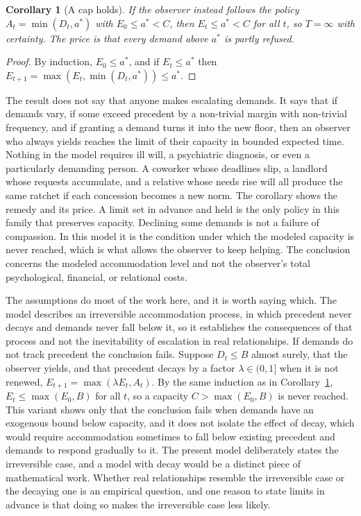 \documentclass[11pt]{article}
\newtheorem{corollary}{Corollary}
\theoremstyle{definition}
\theoremstyle{remark}
\begin{document}
\begin{corollary}[A cap holds]\label{cor:cap}
If the observer instead follows the policy $A_t=\min(D_t,a^{*})$ with $E_0\le a^{*}<C$, then $E_t\le a^{*}<C$ for all $t$, so $T=\infty$ with certainty. The price is that every demand above $a^{*}$ is partly refused.
\end{corollary}

\begin{proof}
By induction, $E_0\le a^{*}$, and if $E_t\le a^{*}$ then $E_{t+1}=\max(E_t,\min(D_t,a^{*}))\le a^{*}$.
\end{proof}

The result does not say that anyone makes escalating demands. It says that if demands vary, if some exceed precedent by a non-trivial margin with non-trivial frequency, and if granting a demand turns it into the new floor, then an observer who always yields reaches the limit of their capacity in bounded expected time. Nothing in the model requires ill will, a psychiatric diagnosis, or even a particularly demanding person. A coworker whose deadlines slip, a landlord whose requests accumulate, and a relative whose needs rise will all produce the same ratchet if each concession becomes a new norm. The corollary shows the remedy and its price. A limit set in advance and held is the only policy in this family that preserves capacity. Declining some demands is not a failure of compassion. In this model it is the condition under which the modeled capacity is never reached, which is what allows the observer to keep helping. The conclusion concerns the modeled accommodation level and not the observer's total psychological, financial, or relational costs.

The assumptions do most of the work here, and it is worth saying which. The model describes an irreversible accommodation process, in which precedent never decays and demands never fall below it, so it establishes the consequences of that process and not the inevitability of escalation in real relationships. If demands do not track precedent the conclusion fails. Suppose $D_t\le B$ almost surely, that the observer yields, and that precedent decays by a factor $\lambda\in(0,1]$ when it is not renewed, $E_{t+1}=\max(\lambda E_t,A_t)$. By the same induction as in Corollary~\ref{cor:cap}, $E_t\le\max(E_0,B)$ for all $t$, so a capacity $C>\max(E_0,B)$ is never reached. This variant shows only that the conclusion fails when demands have an exogenous bound below capacity, and it does not isolate the effect of decay, which would require accommodation sometimes to fall below existing precedent and demands to respond gradually to it. The present model deliberately states the irreversible case, and a model with decay would be a distinct piece of mathematical work. Whether real relationships resemble the irreversible case or the decaying one is an empirical question, and one reason to state limits in advance is that doing so makes the irreversible case less likely.
\end{document}
